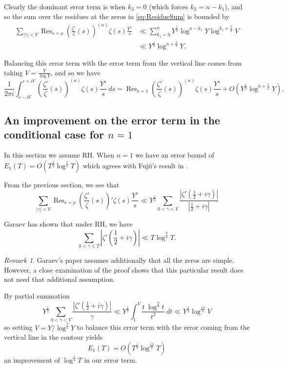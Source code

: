 \documentclass[12pt,a4paper,reqno]{amsart}
\DeclareMathOperator*{\Res}{Res}
\theoremstyle{remark}
\newtheorem*{remark}{Remark}
\numberwithin{equation}{section}
\begin{document}
Clearly the dominant error term is when $k_3=0$ (which forces $k_2=n-k_1$), and so the sum over the residues at the zeros in \eqref{eq:ResidueSum} is bounded by
\begin{align*}
\sum_{|\gamma|<V} \Res_{s=\rho} \left( \frac{\zeta'}{\zeta}(s) \right)^{(n)} \zeta(s) \frac{Y^s}{s} &\ll \sum_{k_1 = 0}^n Y^{\frac{1}{2}} \log ^{n-k_1} Y \log^{k_1 + \frac{5}{2}} V \\
&\ll Y^{\frac{1}{2}} \log ^{n+\frac52} Y .
\end{align*}

Balancing this error term with the error term from the vertical line comes from taking $V=\frac{Y}{\log Y}$, and so we have
\[
\frac{1}{2 \pi i } \int_{c- iV}^{c + iV}\left( \frac{\zeta'}{\zeta}(s) \right)^{(n)} \zeta(s) \frac{Y^s}{s} \ ds = \Res_{s=1} \left( \frac{\zeta'}{\zeta}(s) \right)^{(n)} \zeta(s) \frac{Y^s}{s} + O \left( Y^{\frac{1}{2}} \log^{n+\frac{5}{2}} Y \right).
\]



\subsection{An improvement on the error term in the conditional case for $n=1$}
In this section we assume RH. When $n=1$ we have an error bound of $E_1(T) = O \left( T^{\frac{1}{2}} \log^{\frac{7}{2}} T\right)$ which agrees with Fujii's result in \cite{FujiiShanks}. 

From the previous section, we see that
\begin{equation*}
\sum_{|\gamma|<V}  \Res_{s=\rho} \left( \frac{\zeta'}{\zeta}(s) \right)' \zeta(s) \frac{Y^s}{s} \ll Y^{\frac12} \sum_{0 < \gamma < V} \frac{\left|\zeta' \left( \frac{1}{2} + i\gamma \right) \right|}{|\frac12+i\gamma|}
\end{equation*}


Garaev \cite{Garaev} has shown that under RH, we have
\[
\sum_{0 < \gamma \leq T} \left|\zeta ' \left( \frac{1}{2} + i\gamma \right) \right| \ll T \log^{\frac{9}{4}} T.
\]
\begin{remark}
Garaev's paper assumes additionally that all the zeros are simple. However, a close examination of the proof shows that this particular result does not need that additional assumption.
\end{remark}
By partial summation  
\begin{equation*}
Y^{\frac{1}{2}} \sum_{0 < \gamma < V} \frac{| \zeta ' ( \frac{1}{2} + i\gamma) |}{\gamma} \ll Y^{\frac{1}{2}} \int_{1}^{V} \frac{t \ \log^{\frac{9}{4}} t}{t^2} \ dt \ll Y^{\frac{1}{2}} \log ^{\frac{13}{4}} V
\end{equation*}
so setting $V= Y/\log^{\frac{3}{2}} Y$ to balance this error term with the error coming from the vertical line in the contour yields
\[
E_1(T) = O\left(T^{\frac12} \log^{\frac{13}{4}} T \right)
\]
an improvement of $\log^{\frac{1}{4}} T$ in our error term. 
\end{document}
